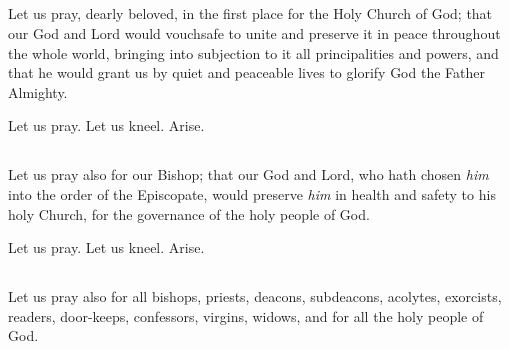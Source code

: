 \subsection{}
Let us pray, dearly beloved, in the first place for the Holy Church of God; that our God and Lord would vouchsafe to unite and preserve it in peace throughout the whole world, bringing into subjection to it all principalities and powers, and that he would grant us by quiet and peaceable lives to glorify God the Father Almighty.

\centerline{Let us pray. Let us kneel. Arise.}

\subsection{}

\subsection{}
Let us pray also for our Bishop; that our God and Lord, who hath chosen \emph{him} into the order of the Episcopate, would preserve \emph{him} in health and safety to his holy Church, for the governance of the holy people of God.

\centerline{Let us pray. Let us kneel. Arise.}

\subsection{}

\subsection{}
Let us pray also for all bishops, priests, deacons, subdeacons, acolytes, exorcists, readers, door-keeps, confessors, virgins, widows, and for all the holy people of God. 

